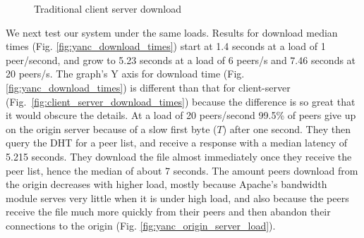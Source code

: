 \begin{figure}
  \begin{center}
    \caption{Traditional client server download}  
  \end{center}
\end{figure}

We next test our system under the same loads. Results for download median times 
(Fig. \ref{fig:yanc_download_times}) start at 1.4 seconds at a load of 1 peer/second, and grow 
to 5.23 seconds at a load of 6 peers/s and 7.46 seconds at 20 peers/s. The graph's Y axis for download time (Fig. \ref{fig:yanc_download_times}) 
is different than that for client-server (Fig.~\ref{fig:client_server_download_times}) 
because the difference is so great that it would obscure the details. At a load of 20 peers/second 99.5\% 
of peers give up on the origin server because of a slow first byte ($T$) after one second. They then query the 
DHT for a peer list, and receive a response with a median latency of 5.215 seconds.  They download the file almost 
immediately once they receive the peer list, hence the median of about 7 seconds. 
The amount peers download from the origin decreases with higher load, mostly because Apache's bandwidth module serves 
very little when it is under high load, and also because the peers receive the file much more quickly 
from their peers and then abandon their connections to the origin (Fig. \ref{fig:yanc_origin_server_load}).

